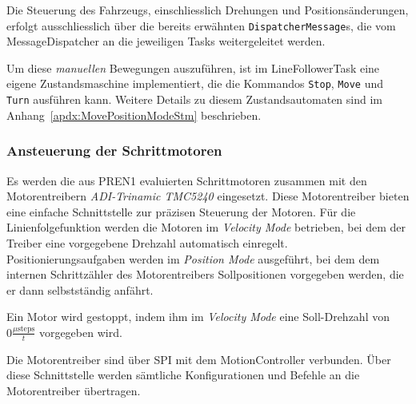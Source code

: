 \documentclass[main.tex]{subfiles} %
\begin{document}
Die Steuerung des Fahrzeugs, einschliesslich Drehungen und Positionsänderungen,
erfolgt ausschliesslich über die bereits erwähnten \texttt{DispatcherMessage}s,
die vom MessageDispatcher an die jeweiligen Tasks weitergeleitet werden.

Um diese \textit{manuellen} Bewegungen auszuführen, ist im LineFollowerTask
eine eigene Zustandsmaschine implementiert, die die Kommandos \texttt{Stop},
\texttt{Move} und \texttt{Turn} ausführen kann. Weitere Details zu diesem
Zustandsautomaten sind im Anhang~\ref{apdx:MovePositionModeStm} beschrieben.

\subsubsection*{Ansteuerung der Schrittmotoren}

Es werden die aus PREN1 evaluierten Schrittmotoren zusammen mit den
Motorentreibern \textit{ADI-Trinamic TMC5240} eingesetzt. Diese Motorentreiber
bieten eine einfache Schnittstelle zur präzisen Steuerung der Motoren. Für die
Linienfolgefunktion werden die Motoren im \textit{Velocity Mode} betrieben, bei
dem der Treiber eine vorgegebene Drehzahl automatisch einregelt.
Positionierungsaufgaben werden im \textit{Position Mode} ausgeführt, bei dem
dem internen Schrittzähler des Motorentreibers Sollpositionen vorgegeben
werden, die er dann selbstständig anfährt.

Ein Motor wird gestoppt, indem ihm im \textit{Velocity Mode} eine Soll-Drehzahl
von $0 \frac{\mu \text{steps}}{t}$ vorgegeben wird.

Die Motorentreiber sind über SPI mit dem MotionController verbunden. Über diese
Schnittstelle werden sämtliche Konfigurationen und Befehle an die
Motorentreiber übertragen.

\end{document}
